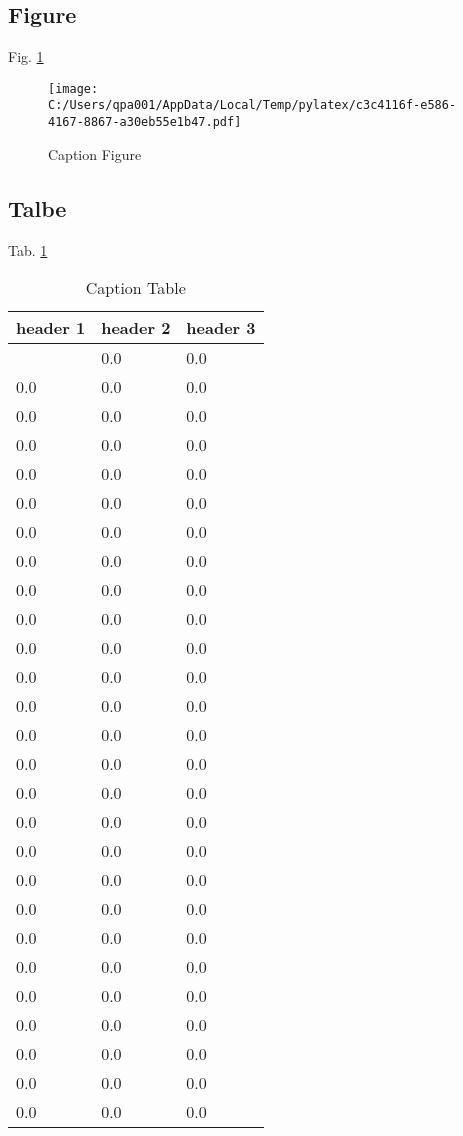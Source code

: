 \documentclass{article}%
\begin{document}
%
\subsection{Figure}%
\label{subsec:Figure}%
Fig. \ref{figure:fig1}%


\begin{figure}[h!]%
\centering%
\texttt{[image: C:/Users/qpa001/AppData/Local/Temp/pylatex/c3c4116f-e586-4167-8867-a30eb55e1b47.pdf]}%
\caption{Caption Figure}%
\label{figure:fig1}%
\end{figure}

%
\subsection{Talbe}%
\label{subsec:Talbe}%
Tab. \ref{table:tab1}%
\begin{longtable}{|l|l|l|}%
\caption{Caption Table}%
\label{table:tab1}\\%
\hline%
header 1&header 2&header 3\\%
\hline%
\endhead%
\hline%
\endfoot%
\hline%
\endlastfoot%
0.0&0.0&0.0\\%
0.0&0.0&0.0\\%
0.0&0.0&0.0\\%
0.0&0.0&0.0\\%
0.0&0.0&0.0\\%
0.0&0.0&0.0\\%
0.0&0.0&0.0\\%
0.0&0.0&0.0\\%
0.0&0.0&0.0\\%
0.0&0.0&0.0\\%
0.0&0.0&0.0\\%
0.0&0.0&0.0\\%
0.0&0.0&0.0\\%
0.0&0.0&0.0\\%
0.0&0.0&0.0\\%
0.0&0.0&0.0\\%
0.0&0.0&0.0\\%
0.0&0.0&0.0\\%
0.0&0.0&0.0\\%
0.0&0.0&0.0\\%
0.0&0.0&0.0\\%
0.0&0.0&0.0\\%
0.0&0.0&0.0\\%
0.0&0.0&0.0\\%
0.0&0.0&0.0\\%
0.0&0.0&0.0\\%
0.0&0.0&0.0\\%

\end{longtable}
\end{document}
